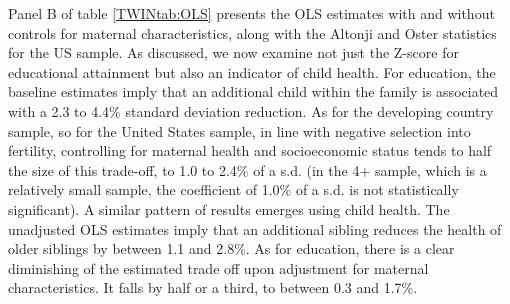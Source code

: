 \documentclass[subeqn]{article}
\begin{document}
\begin{spacing}{1.4}
Panel B of table \ref{TWINtab:OLS} presents the OLS estimates with and without controls for maternal characteristics, along with the Altonji and Oster statistics for the US sample. As discussed, we now examine not just the Z-score for educational attainment %
but also an indicator of child health.  %
For education, the baseline estimates imply that an additional child within the family is
associated with a 2.3 to 4.4\% standard deviation reduction.  %
As for the developing country sample, so for the United States sample, in line with negative selection into fertility, controlling for maternal health and socioeconomic status tends to half the size of this trade-off, to 1.0 to 2.4\% of a s.d. (in the 4+ sample, which is a relatively small sample, the coefficient of 1.0\% of a s.d. is not statistically significant). 
A similar pattern of results emerges using child health. %
The unadjusted OLS estimates imply that an additional sibling reduces the health of older siblings by between 1.1 and 2.8\%. %
As for education, there is a clear diminishing of the estimated trade off upon adjustment for maternal characteristics. It falls by half or a third, to between 0.3 and 1.7\%.

\end{spacing}
\end{document}
